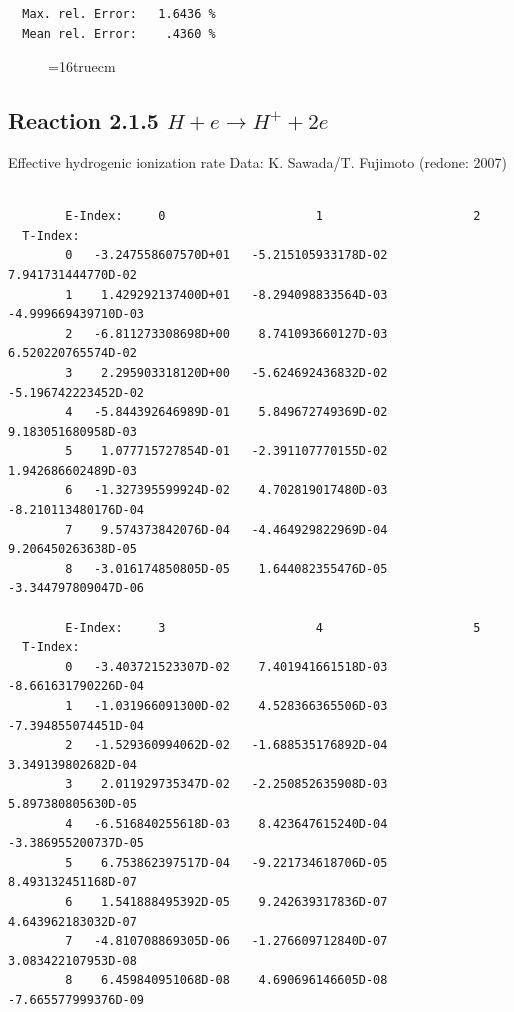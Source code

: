 \documentclass[12pt,dvips]{article}
\begin{document}
\begin{small}
\begin{verbatim}
  Max. rel. Error:   1.6436 %
  Mean rel. Error:    .4360 %
\end{verbatim}\end{small}
\begin{figure} \label{2.1.5o}
\epsfxsize=16truecm
\end{figure}
\newpage


\subsection{
Reaction 2.1.5 $H + e \rightarrow H^+ + 2e $ }


   Effective hydrogenic ionization rate    Data: K. Sawada/T. Fujimoto (redone: 2007)
   \cite{kn:Sawada}

\begin{small}\begin{verbatim}

        E-Index:     0                     1                     2
  T-Index:
        0   -3.247558607570D+01   -5.215105933178D-02    7.941731444770D-02
        1    1.429292137400D+01   -8.294098833564D-03   -4.999669439710D-03
        2   -6.811273308698D+00    8.741093660127D-03    6.520220765574D-02
        3    2.295903318120D+00   -5.624692436832D-02   -5.196742223452D-02
        4   -5.844392646989D-01    5.849672749369D-02    9.183051680958D-03
        5    1.077715727854D-01   -2.391107770155D-02    1.942686602489D-03
        6   -1.327395599924D-02    4.702819017480D-03   -8.210113480176D-04
        7    9.574373842076D-04   -4.464929822969D-04    9.206450263638D-05
        8   -3.016174850805D-05    1.644082355476D-05   -3.344797809047D-06

        E-Index:     3                     4                     5
  T-Index:
        0   -3.403721523307D-02    7.401941661518D-03   -8.661631790226D-04
        1   -1.031966091300D-02    4.528366365506D-03   -7.394855074451D-04
        2   -1.529360994062D-02   -1.688535176892D-04    3.349139802682D-04
        3    2.011929735347D-02   -2.250852635908D-03    5.897380805630D-05
        4   -6.516840255618D-03    8.423647615240D-04   -3.386955200737D-05
        5    6.753862397517D-04   -9.221734618706D-05    8.493132451168D-07
        6    1.541888495392D-05    9.242639317836D-07    4.643962183032D-07
        7   -4.810708869305D-06   -1.276609712840D-07    3.083422107953D-08
        8    6.459840951068D-08    4.690696146605D-08   -7.665577999376D-09


\end{verbatim}
\end{small}
\end{document}
